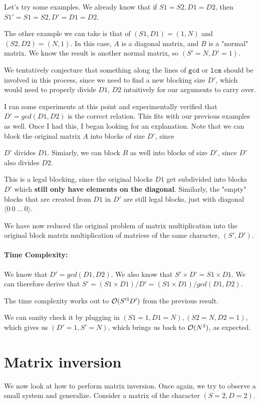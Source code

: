 \documentclass[11pt]{article}
\begin{document}
Let's try some examples. We already know that if $S1 = S2, D1 = D2$, then
$S1' = S1 = S2, D' = D1 = D2$.


The other example we can take is that of $(S1, D1) = (1, N)$ and $(S2, D2) =
(N, 1)$. In this case, $A$ is a diagonal matrix, and $B$ is a "normal" matrix.
We know the result is another normal matrix, so $(S' = N, D' = 1)$.


We tentatively conjecture that something along the lines of $\texttt{gcd}$
or $\texttt{lcm}$ should be involved in this process, since we need to find
a new blocking size $D'$, which would need to properly divide $D1$, $D2$ 
intuitively for our arguments to carry over. 


I ran some experiments at this point and experimentally verified that 
$D' = gcd(D1, D2)$ is the correct relation. This fits with our previous
examples as well. Once I had this, I began looking for an explanation.
Note that we can block the original matrix $A$ into blocks of size $D'$, since

$D'$ divides $D1$.  Simiarly, we can block $B$ as well into blocks of size
$D'$, since $D'$ also divides $D2$.

This is a legal blocking, since the original blocks $D1$ get subdivided into
blocks $D'$ which \textbf{still only have elements on the diagonal}. Similarly,
the "empty" blocks that are created from $D1$ in $D'$ are still legal blocks,
just with diagonal $\langle 0~0~\dots~0 \rangle$.


We have now reduced the original problem of matrix multiplication into the
original block matrix multiplication of matrices of the same character, $(S', D')$.

\paragraph{\textbf{Time Complexity:}}
We know that $D' = gcd(D1, D2)$. We also know that $S' \times D' = S1 \times D1$.
We can therefore derive that $S' = (S1 \times D1) / D' = (S1 \times D1) / gcd(D1, D2)$.

The time complexity works out to $\mathcal{O}(S'^3 D')$ from the previous result.

We can sanity check it by plugging in $(S1 = 1, D1 = N), (S2 = N, D2 = 1)$, which gives us
$(D' = 1, S' = N)$, which brings us back to $\mathcal{O}(N^3)$, as expected.


\section{Matrix inversion}
We now look at how to perform matrix inversion. Once again, we try to observe
a small system and generalize. Consider a matrix of the character $(S = 2, D = 2)$.
\end{document}
